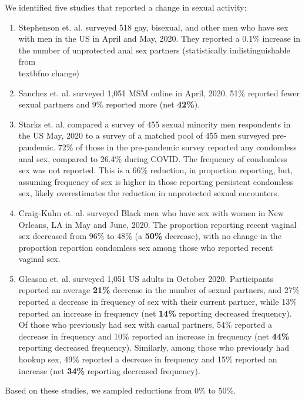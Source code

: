\documentclass{article}
\begin{document}
We identified five studies that reported a change in sexual activity:
\begin{enumerate}
	\item Stephenson et. al. \cite{stephenson2020} surveyed 518 gay, bisexual, and other men who have sex with men in the US in April and May, 2020. They reported a 0.1\% increase in the number of unprotected anal sex partners (statistically indistinguishable from \\textbf{no change})
	\item Sanchez et. al. \cite{sanchez2020} surveyed 1,051 MSM online in April, 2020. 51\% reported fewer sexual partners and 9\% reported more (net \textbf{42\%}).
	\item Starks et. al. \cite{starks2020} compared a survey of 455 sexual minority men respondents in the US May, 2020 to a survey of a matched pool of 455 men surveyed pre-pandemic. 72\% of those in the pre-pandemic survey reported any condomless anal sex, compared to 26.4\% during COVID. The frequency of condomless sex was not reported. This is a 66\% reduction, in proportion reporting, but, assuming frequency of sex is higher in those reporting persistent condomless sex, likely overestimates the reduction in unprotected sexual encounters.
	\item Craig-Kuhn et. al. \cite{craigkuhn2021} surveyed Black men who have sex with women in New Orleans, LA in May and June, 2020. The proportion reporting recent vaginal sex decreased from 96\% to 48\% (a \textbf{50\%} decrease), with no change in the proportion reportion condomless sex among those who reported recent vaginal sex.
	\item Gleason et. al. \cite{gleason2021} surveyed 1,051 US adults in October 2020. Participants reported an average \textbf{21\%} decrease in the number of sexual partners, and 27\% reported a decrease in frequency of sex with their current partner, while 13\% reported an increase in frequency (net \textbf{14\%} reporting decreased frequency).  Of those who previously had sex with casual partners, 54\% reported a decrease in frequency and 10\% reported an increase in frequency (net \textbf{44\%} reporting decreased frequency). Similarly, among those who previously had hookup sex, 49\% reported a decrease in frequency and 15\% reported an increase (net \textbf{34\%} reporting decreased frequency).
\end{enumerate}

Based on these studies, we sampled reductions from 0\% to 50\%.
\end{document}
